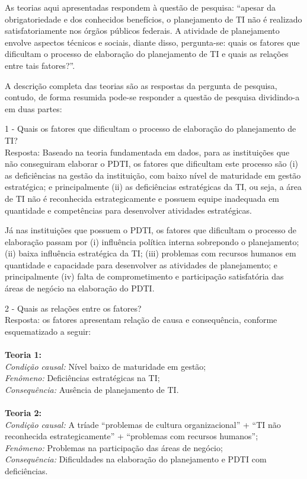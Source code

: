 As teorias aqui apresentadas respondem à questão de pesquisa: ``apesar da obrigatoriedade e dos conhecidos benefícios, o planejamento de TI não é realizado satisfatoriamente nos órgãos públicos federais. A atividade de planejamento envolve aspectos técnicos e sociais, diante disso, pergunta-se: quais os fatores que dificultam o processo de elaboração do planejamento de TI e quais as relações entre tais fatores?''.

A descrição completa das teorias são as respostas da pergunta de pesquisa, contudo, de forma resumida pode-se responder a questão de pesquisa dividindo-a em duas partes:

1 - Quais os fatores que dificultam o processo de elaboração do planejamento de TI?\\
Resposta: Baseado na teoria fundamentada em dados, para as instituições que não conseguiram elaborar o PDTI, os fatores que dificultam este processo são (i) as deficiências na gestão da instituição, com baixo nível de maturidade em gestão estratégica; e principalmente (ii) as deficiências estratégicas da TI, ou seja, a área de TI não é reconhecida estrategicamente e possuem equipe inadequada em quantidade e competências para desenvolver atividades estratégicas.

Já nas instituições que possuem o PDTI, os fatores que dificultam o processo de elaboração passam por (i) influência política interna sobrepondo o planejamento; (ii) baixa influência estratégica da TI; (iii) problemas com recursos humanos em quantidade e capacidade para desenvolver as atividades de planejamento; e principalmente (iv) falta de comprometimento e participação satisfatória das áreas de negócio na elaboração do PDTI.

2 - Quais as relações entre os fatores?\\
Resposta: os fatores apresentam relação de causa e consequência, conforme esquematizado a seguir:
\\
\\
\textbf{Teoria 1:}\\
\textit{Condição causal:} Nível baixo de maturidade em gestão;\\
\textit{Fenômeno:} Deficiências estratégicas na TI;\\
\textit{Consequência:} Ausência de planejamento de TI.
\\
\\
\textbf{Teoria 2:}\\
\textit{Condição causal:} A tríade ``problemas de cultura organizacional'' + ``TI não reconhecida estrategicamente'' + ``problemas com recursos humanos'';\\
\textit{Fenômeno:} Problemas na participação das áreas de negócio;\\
\textit{Consequência:} Dificuldades na elaboração do planejamento e PDTI com deficiências.


